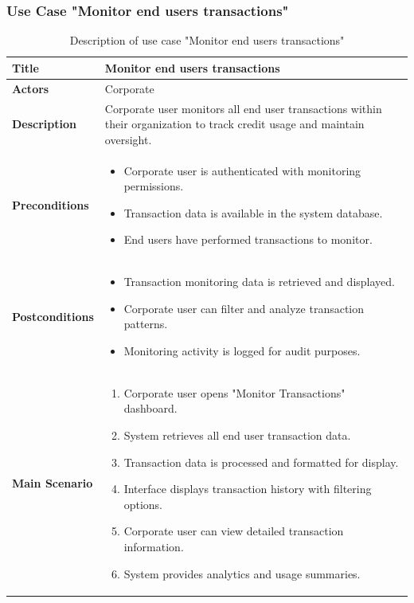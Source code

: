 \subsubsection{Use Case "Monitor end users transactions"}
\begin{longtable}{|p{}|p{}|}
  \caption{Description of use case "Monitor end users transactions"}
  \label{tab:uc_monitor_transactions} \\
  \hline
  \textbf{Title} & Monitor end users transactions \\ \hline
  \textbf{Actors} & Corporate \\ \hline
  \textbf{Description} & Corporate user monitors all end user transactions within their organization to track credit usage and maintain oversight. \\ \hline
  \textbf{Preconditions} & 
    \begin{itemize}[nosep,leftmargin=*]
      \item Corporate user is authenticated with monitoring permissions.
      \item Transaction data is available in the system database.
      \item End users have performed transactions to monitor.
    \end{itemize} \\ \hline
  \textbf{Postconditions} & 
    \begin{itemize}[nosep,leftmargin=*]
      \item Transaction monitoring data is retrieved and displayed.
      \item Corporate user can filter and analyze transaction patterns.
      \item Monitoring activity is logged for audit purposes.
    \end{itemize} \\ \hline
 \textbf{Main Scenario} &
    \begin{enumerate}[nosep,leftmargin=*]
      \item Corporate user opens "Monitor Transactions" dashboard.
      \item System retrieves all end user transaction data.
      \item Transaction data is processed and formatted for display.
      \item Interface displays transaction history with filtering options.
      \item Corporate user can view detailed transaction information.
      \item System provides analytics and usage summaries.

\end{enumerate}
\end{longtable}
